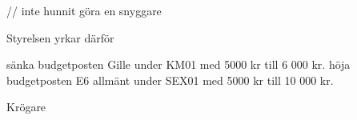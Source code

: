 \documentclass[../_main/handlingar.tex]{subfiles}
\begin{document}
    // inte hunnit göra en snyggare

Styrelsen yrkar därför 
\begin{attsatser}
    \att sänka budgetposten Gille under KM01 med 5000 kr till 6 000 kr.
    \att höja budgetposten E6 allmänt under SEX01 med 5000 kr till 10 000 kr. 
\end{attsatser}

\begin{signatures}{1}
    \ist
    \signature{\krog}{Krögare}
\end{signatures}
\end{document}

